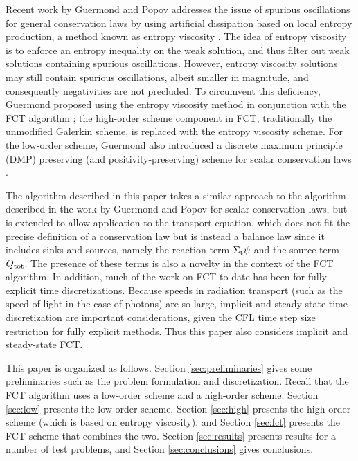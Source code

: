 Recent work by Guermond and Popov addresses the issue of spurious oscillations
for general conservation laws by using artificial dissipation based on
local entropy production, a method known as entropy viscosity \cite{guermond_ev}.
The idea of entropy viscosity is to enforce an entropy inequality on the weak solution,
and thus filter out weak solutions containing spurious oscillations. However,
entropy viscosity solutions may still contain spurious
oscillations, albeit smaller in magnitude, and consequently negativities
are not precluded. To circumvent this deficiency, Guermond proposed using
the entropy viscosity method in conjunction with the FCT
algorithm \cite{guermond_secondorder}; the high-order scheme component in FCT,
traditionally the unmodified Galerkin scheme, is replaced with the entropy
viscosity scheme.
For the low-order
scheme, Guermond also introduced
a discrete maximum principle (DMP) preserving (and positivity-preserving)
scheme for scalar
conservation laws \cite{guermond_firstorder}.

The algorithm described in this paper takes a similar approach to the algorithm
described in the work by Guermond and Popov for scalar conservation laws,
but is extended to allow application to the transport equation,
which does not fit the precise definition of a conservation law but is instead a
balance law since it includes sinks and sources, namely the reaction term
$\Sigma_\textup{t}\psi$ and the source term $Q_\textup{tot}$. The presence
of these terms is also a novelty in the context of the FCT algorithm.
In addition, much of the work on FCT to date has been for fully explicit time
discretizations. Because speeds in radiation transport (such as the speed of light
in the case of photons)
are so large, implicit and steady-state time discretization are important
considerations, given the CFL time step size restriction for fully explicit
methods. Thus this paper also considers implicit and steady-state FCT.

This paper is organized as follows. Section \ref{sec:preliminaries} gives
some preliminaries such as the problem formulation and discretization.
Recall that the FCT algorithm uses a low-order scheme and a high-order scheme.
Section \ref{sec:low} presents the low-order scheme, Section \ref{sec:high}
presents the high-order scheme (which is based on entropy viscosity),
and Section \ref{sec:fct} presents the FCT scheme that combines the two. Section
\ref{sec:results} presents results for a number of test problems, and
Section \ref{sec:conclusions} gives conclusions.
